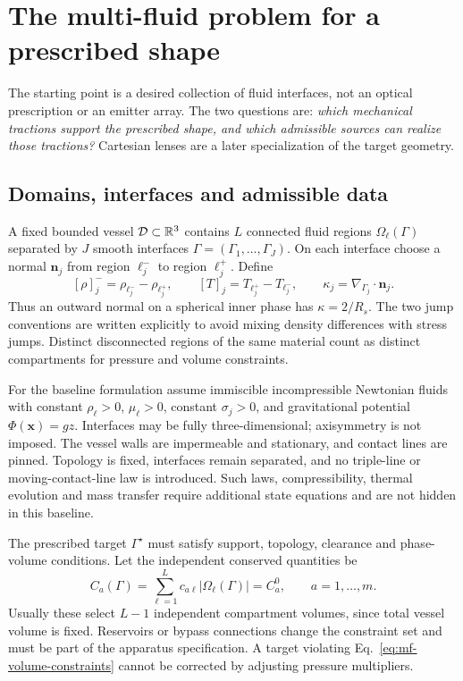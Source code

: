 \section{The multi-fluid problem for a prescribed shape}
\label{sec:multifluid-start}
The starting point is a desired collection of fluid interfaces, not an
optical prescription or an emitter array. The two questions are:
\emph{which mechanical tractions support the prescribed shape, and which
admissible sources can realize those tractions?} Cartesian lenses are a
later specialization of the target geometry.

\subsection{Domains, interfaces and admissible data}
A fixed bounded vessel $\mathcal D\subset\mathbb R^3$ contains $L$ connected fluid
regions $\Omega_\ell(\Gamma)$ separated by $J$ smooth interfaces
$\Gamma=(\Gamma_1,\ldots,\Gamma_J)$. On each interface choose a normal
$\mathbf n_j$ from region $\ell_j^-$ to region $\ell_j^+$. Define
\begin{equation}\label{eq:mf-conventions}
 [\rho]_j^- =\rho_{\ell_j^-}-\rho_{\ell_j^+},\qquad
 [T]_j=T_{\ell_j^+}-T_{\ell_j^-},\qquad
 \kappa_j=\nabla_{\Gamma_j}\cdot\mathbf n_j.
\end{equation}
Thus an outward normal on a spherical inner phase has $\kappa=2/R_s$.
The two jump conventions are written explicitly to avoid mixing density
differences with stress jumps. Distinct disconnected regions of the same
material count as distinct compartments for pressure and volume constraints.

For the baseline formulation assume immiscible incompressible Newtonian
fluids with constant $\rho_\ell>0$, $\mu_\ell>0$, constant
$\sigma_j>0$, and gravitational potential $\Phi(\mathbf x)=gz$.
Interfaces may be fully three-dimensional; axisymmetry is not imposed.
The vessel walls are impermeable and stationary, and contact lines are
pinned. Topology is fixed, interfaces remain separated, and no triple-line
or moving-contact-line law is introduced. Such laws, compressibility,
thermal evolution and mass transfer require additional state equations and
are not hidden in this baseline.

The prescribed target $\Gamma^\star$ must satisfy support, topology,
clearance and phase-volume conditions. Let the independent conserved
quantities be
\begin{equation}\label{eq:mf-volume-constraints}
 C_a(\Gamma)=\sum_{\ell=1}^L c_{a\ell}|\Omega_\ell(\Gamma)|
 =C_a^0,\qquad a=1,\ldots,m.
\end{equation}
Usually these select $L-1$ independent compartment volumes, since total
vessel volume is fixed. Reservoirs or bypass connections change the
constraint set and must be part of the apparatus specification. A target
violating Eq.~\eqref{eq:mf-volume-constraints} cannot be corrected by
adjusting pressure multipliers.

